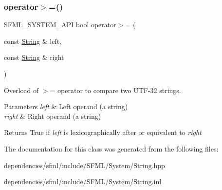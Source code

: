 \subsubsection{\texorpdfstring{operator$>$=()}{operator>=()}}
{\footnotesize\ttfamily S\+F\+M\+L\+\_\+\+S\+Y\+S\+T\+E\+M\+\_\+\+A\+PI bool operator$>$= (\begin{DoxyParamCaption}\item[{const \hyperlink{classsf_1_1_string}{String} \&}]{left,  }\item[{const \hyperlink{classsf_1_1_string}{String} \&}]{right }\end{DoxyParamCaption})\hspace{0.3cm}{\ttfamily [related]}}



Overload of $>$= operator to compare two U\+T\+F-\/32 strings. 


\begin{DoxyParams}{Parameters}
{\em left} & Left operand (a string) \\
\hline
{\em right} & Right operand (a string)\\
\hline
\end{DoxyParams}
\begin{DoxyReturn}{Returns}
True if {\itshape left} is lexicographically after or equivalent to {\itshape right} 
\end{DoxyReturn}


The documentation for this class was generated from the following files\+:\begin{DoxyCompactItemize}
\item 
dependencies/sfml/include/\+S\+F\+M\+L/\+System/String.\+hpp\item 
dependencies/sfml/include/\+S\+F\+M\+L/\+System/String.\+inl\end{DoxyCompactItemize}
